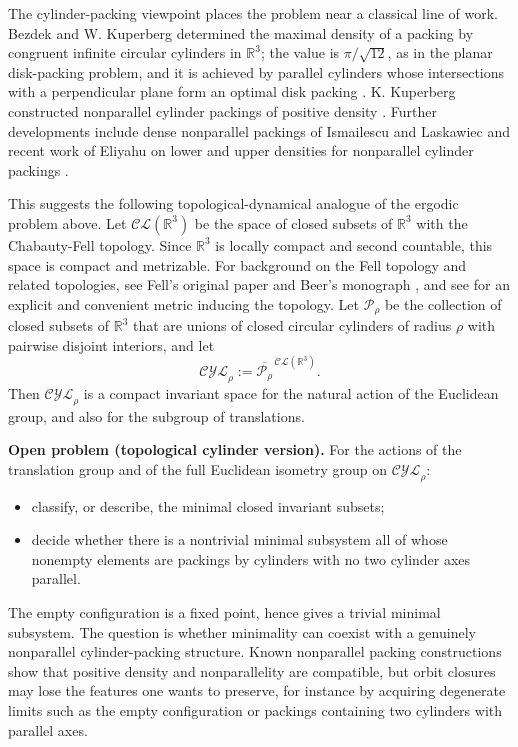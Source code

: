 \documentclass[11pt]{article}
\theoremstyle{remark}
\begin{document}
The cylinder-packing viewpoint places the problem near a classical line of work. Bezdek and W. Kuperberg determined the maximal density of a packing by congruent infinite circular cylinders in $\mathbb R^3$; the value is $\pi/\sqrt{12}$, as in the planar disk-packing problem, and it is achieved by parallel cylinders whose intersections with a perpendicular plane form an optimal disk packing \cite{BezdekKuperberg}. K. Kuperberg constructed nonparallel cylinder packings of positive density \cite{KuperbergNonparallel}. Further developments include dense nonparallel packings of Ismailescu and Laskawiec \cite{IsmailescuLaskawiec} and recent work of Eliyahu on lower and upper densities for nonparallel cylinder packings \cite{Eliyahu}.

This suggests the following topological-dynamical analogue of the
ergodic problem above. Let $\mathcal{CL}(\mathbb R^3)$ be the space of
closed subsets of $\mathbb R^3$ with the Chabauty-Fell topology. Since
$\mathbb R^3$ is locally compact and second countable, this space is
compact and metrizable. For background on the Fell topology and
related topologies, see Fell's original paper \cite{Fell} and Beer's
monograph \cite{Beer}, and see \cite[Appendix]{SolomonSmilansky} for an explicit
and convenient metric inducing the topology. Let $\mathcal P_\rho$ be the collection of closed subsets of $\mathbb R^3$ that are unions of closed circular cylinders of radius $\rho$ with pairwise disjoint interiors, and let
\[
\mathcal{CYL}_\rho:=\overline{\mathcal P_\rho}^{\,\mathcal{CL}(\mathbb R^3)}.
\]
Then $\mathcal{CYL}_\rho$ is a compact invariant space for the natural action of the Euclidean group, and also for the subgroup of translations.

\medskip
\noindent\textbf{Open problem (topological cylinder version).}
For the actions of the translation group and of the full Euclidean isometry group on $\mathcal{CYL}_\rho$:
\begin{itemize}[leftmargin=2em]
\item classify, or describe, the minimal closed invariant subsets;
\item decide whether there is a nontrivial minimal subsystem all of whose nonempty elements are packings by cylinders with no two cylinder axes parallel.
\end{itemize}
The empty configuration is a fixed point, hence gives a trivial minimal subsystem. The question is whether minimality can coexist with a genuinely nonparallel cylinder-packing structure. Known nonparallel packing constructions show that positive density and nonparallelity are compatible, but orbit closures may lose the features one wants to preserve, for instance by acquiring degenerate limits such as the empty configuration or packings containing two cylinders with parallel axes.
\end{document}

